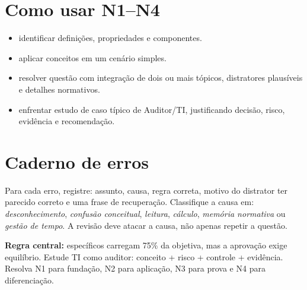 \section{Como usar N1--N4}

\begin{itemize}
\item {} identificar definições, propriedades e componentes.
\item {} aplicar conceitos em um cenário simples.
\item {} resolver questão com integração de dois ou mais tópicos, distratores plausíveis e detalhes normativos.
\item {} enfrentar estudo de caso típico de Auditor/TI, justificando decisão, risco, evidência e recomendação.
\end{itemize}

\section{Caderno de erros}

Para cada erro, registre: assunto, causa, regra correta, motivo do distrator ter parecido correto e uma frase de recuperação. Classifique a causa em: \emph{desconhecimento}, \emph{confusão conceitual}, \emph{leitura}, \emph{cálculo}, \emph{memória normativa} ou \emph{gestão de tempo}. A revisão deve atacar a causa, não apenas repetir a questão.

\begin{resumo}
\textbf{Regra central:} específicos carregam 75\% da objetiva, mas a aprovação exige equilíbrio. Estude TI como auditor: conceito + risco + controle + evidência. Resolva N1 para fundação, N2 para aplicação, N3 para prova e N4 para diferenciação.
\end{resumo}
